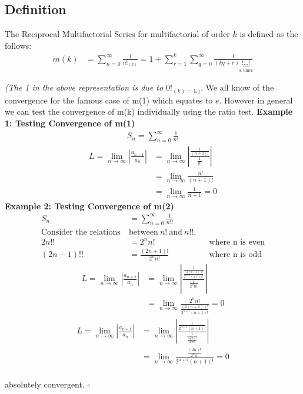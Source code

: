 \documentclass[12pt]{article}
\numberwithin{equation}{section}
\begin{document}
\subsection{Definition}
The Reciprocal Multifactorial Series for multifactorial of order $k$ is defined as the follows:
\begin{align}
    m(k)&=\sum_{n=0}^{\infty}\frac{1}{n!_{(k)}}=1+\sum_{r=1}^{k}\sum_{q=0}^{\infty}\frac{1}{(kq+r)\underbrace{!\dots!}_{\text{k times}}}
\end{align}\par
\emph{(The 1 in the above representation is due to $0!_{(k)=1.)}$.} We all know of the convergence for the famous case of m(1) which equates to $e$. However in general we can test the convergence of m(k) individually using the ratio test.
\clearpage
\textbf{Example 1: Testing Convergence of m(1)}
\begin{align*}
    S_n=\sum_{n=0}^{\infty}\frac{1}{n!}
\end{align*}
\begin{align*}
    L=\lim_{n\rightarrow \infty}\left | \frac{a_{n+1}}{a_{n}} \right|&=\lim_{n\rightarrow \infty} \left |\frac{\frac{1}{(n+1)!}}{\frac{1}{n!}}\right|\\
    &=\lim_{n\rightarrow \infty}\frac{n!}{(n+1)!}\\
    &=\lim_{n\rightarrow \infty}\frac{1}{n+1}=0
\end{align*}
\vfill 
\textbf{Example 2: Testing Convergence of m(2)}
\begin{align*}
    S_n &=\sum_{n=0}^{\infty}\frac{1}{n!!}\\
    \text{Consider the relations}\ &\text{between}\ n!\ \text{and}\ n!!.\\
    2n!! &= 2^n n! && \text{where n is even}\\
    (2n-1)!! &= \frac{(2n+1)!}{2^n n!} && \text{where n is odd}
\end{align*}
\begin{align*}
    L=\lim_{n\rightarrow \infty}\left | \frac{a_{n+1}}{a_{n}} \right|&=\lim_{n\rightarrow \infty}\left | \frac{\frac{1}{\frac{(2(n+1))!}{2^{n+1}(n+1)!}}}{\frac{1}{2^n n!}} \right |\\
    &=\lim_{n\rightarrow \infty}\frac{2^n n!}{\frac{(2 (n+1))!}{2^{n+1} (n+1)!}}=0
\end{align*}
\begin{align*}
    L=\lim_{n\rightarrow \infty}\left | \frac{a_{n+1}}{a_{n}} \right|&=\lim_{n\rightarrow \infty}\left | \frac{\frac{1}{2^{n+1}(n+1)!}}{\frac{1}{\frac{(2n)!}{2^n n!}}} \right |\\
    &=\lim_{n\rightarrow \infty}\frac{\frac{(2n)!}{2^n n!}}{2^{n+1}(n+1)!}=0
\end{align*}
\\ 
absolutely convergent. \hfill $\square$
\end{document}
